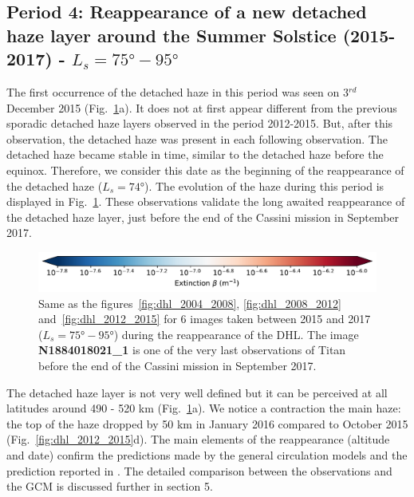 \subsection{Period 4: Reappearance of a new detached haze layer around the Summer Solstice (2015-2017) - $L_s=\ang{75}-\ang{95}$}

The first occurrence of the detached haze in this period was seen on 3$^{rd}$ December 2015
(Fig.~\ref{fig:dhl_2015_2017}a). It
does not at first appear different from the previous sporadic detached haze layers observed in the period 2012-2015. But, after
this observation, the detached haze was present in each following observation. The detached haze became stable in time,
similar to the detached haze before the equinox. Therefore, we consider this date as the beginning of the
reappearance of the detached haze ($L_s=\ang{74}$). The evolution of the haze during this period is displayed in
Fig.~\ref{fig:dhl_2015_2017}. These observations validate the long awaited reappearance of the detached haze layer,
just before the end of the Cassini mission in September 2017.

\begin{figure}[!ht]
\includegraphics[width=.5\textwidth]{Fig/Extinction_colorbar}
\caption{Same as the figures~\ref{fig:dhl_2004_2008}, \ref{fig:dhl_2008_2012}
and~\ref{fig:dhl_2012_2015} for 6 images taken between 2015 and 2017
($L_s=\ang{75}-\ang{95}$) during the reappearance of the DHL.
The image \textbf{N1884018021\_1} is one of the very last observations of Titan before
the end of the Cassini mission in September 2017.}
\label{fig:dhl_2015_2017}
\end{figure}

The detached haze layer is not very well defined but it can be perceived at all latitudes
around 490 - 520 km (Fig.~\ref{fig:dhl_2015_2017}a). We notice a contraction
the main haze: the top of the haze dropped by 50 km in January 2016 compared to October 2015
(Fig.~\ref{fig:dhl_2012_2015}d). The main elements of the reappearance (altitude and date) confirm the
predictions made by the general circulation models \citep{Lebonnois2012,Larson2015} and the prediction
reported in \cite{West2011}. The detailed comparison between the observations and the GCM is discussed further
in section 5.

